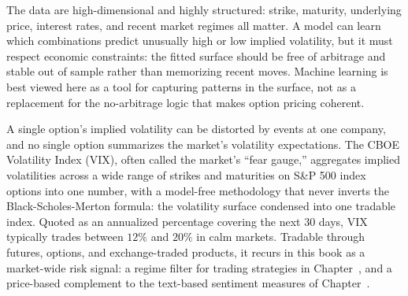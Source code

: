 \documentclass[../ai_in_finance]{subfiles}
\begin{document}
The data are high-dimensional and highly structured: strike, maturity, underlying price, interest rates, and recent market regimes all matter. A model can learn which combinations predict unusually high or low implied volatility, but it must respect economic constraints: the fitted surface should be free of arbitrage and stable out of sample rather than memorizing recent moves. Machine learning is best viewed here as a tool for capturing patterns in the surface, not as a replacement for the no-arbitrage logic that makes option pricing coherent.

A single option's implied volatility can be distorted by events at one company, and no single option
summarizes the market's volatility expectations. The CBOE Volatility Index (VIX), often called the market's
``fear gauge,'' aggregates implied volatilities across a wide range of strikes and maturities on S\&P 500 index options into one number, with a model-free
methodology \parencite[following][]{brittenjones2000option} that never inverts the Black-Scholes-Merton formula: the volatility surface
condensed into one tradable index. Quoted as an annualized percentage covering the next 30 days, VIX typically trades between
$12\%$ and $20\%$ in calm markets. Tradable through futures, options, and exchange-traded products, it recurs in this book as a
market-wide risk signal: a regime filter for trading strategies in Chapter~, and a price-based
complement to the text-based sentiment measures of Chapter~.
\end{document}
